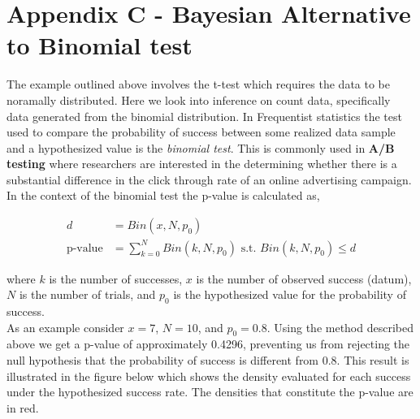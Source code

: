 \documentclass[12pt]{article}
\begin{document}
\pagebreak

\section{Appendix C - Bayesian Alternative to Binomial test}

The example outlined above involves the t-test which requires the data to be noramally distributed. Here we look into inference on count data, specifically data generated from the binomial distribution. In Frequentist statistics the test used to compare the probability of success between some realized data sample and a hypothesized value is the \emph{binomial test}. This is commonly used in \textbf{A/B testing} where researchers are interested in the determining whether there is a substantial difference in the click through rate of an online advertising campaign. \\

\noindent In the context of the binomial test the p-value is calculated as,

\begin{align*}
d &= Bin(x, N, p_0) \\
\mbox{p-value} &= \sum_{k=0}^{N}Bin(k, N, p_0) \mbox{ s.t. } Bin(k, N, p_0) \leq d
\end{align*}

\noindent where $k$ is the number of successes, $x$ is the number of observed success (datum), $N$ is the number of trials, and $p_0$ is the hypothesized value for the probability of success. \\

\noindent As an example consider $x = 7$, $N = 10$, and $p_0 = 0.8$. Using the method described above we get a p-value of approximately 0.4296, preventing us from rejecting the null hypothesis that the probability of success is different from 0.8. This result is illustrated in the figure below which shows the density evaluated for each success under the hypothesized success rate. The densities that constitute the p-value are in red.
\end{document}
